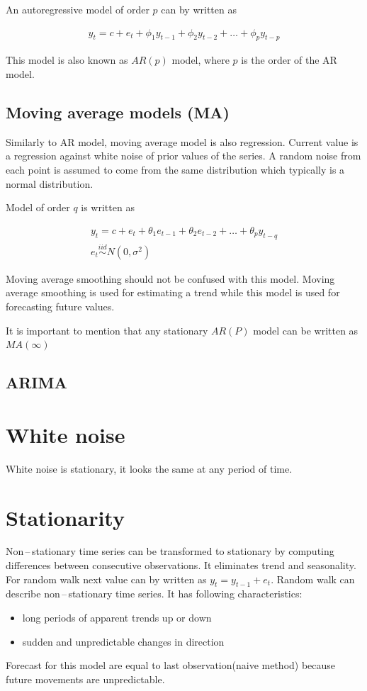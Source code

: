 An autoregressive model of order $p$ can by written as

\begin{eqnarray} \label{ar_model}
    y_t = c + e_t + \phi_1 y_{t-1} + \phi_2 y_{t-2} + \dots + \phi_p y_{t-p} 
\end{eqnarray}

This model is also known as $AR(p)$ model, where $p$ is the order of the AR model.

\subsection{Moving average models (MA)}
Similarly to AR model, moving average model is also regression. Current value is 
a regression against white noise of prior values of the series. A random noise from 
each point is assumed to come from the same distribution which typically is 
a normal distribution.


Model of order $q$ is written as

\begin{eqnarray} \label{ar_model}
    y_t = c + e_t + \theta_1 e_{t-1} + \theta_2 e_{t-2} + \dots + \theta_p y_{t-q} \\
    \nonumber e_t \overset{iid}{\sim} N(0, \sigma^2)
\end{eqnarray}

Moving average smoothing should not be confused with this model. Moving average smoothing
is used for estimating a trend while this model is used for forecasting
future values.

It is important to mention that any stationary $AR(P)$ model can be written as $MA(\infty)$

\subsection{ARIMA}

\section{White noise}
White noise is stationary, it looks the same at any period of time.

\section{Stationarity}
Non\,--\,stationary time series can be transformed to stationary by computing differences
between consecutive observations. It eliminates trend and seasonality. For random walk 
next value can by written as $ y_t = y_{t-1} + e_t $. Random walk can describe
non\,--\,stationary time series. It has following characteristics: 
\begin{itemize}
    \item long periods of apparent trends up or down 
    \item sudden and unpredictable changes in direction
\end{itemize}
Forecast for this model are equal to last observation(naive method) because future movements are
unpredictable. 

